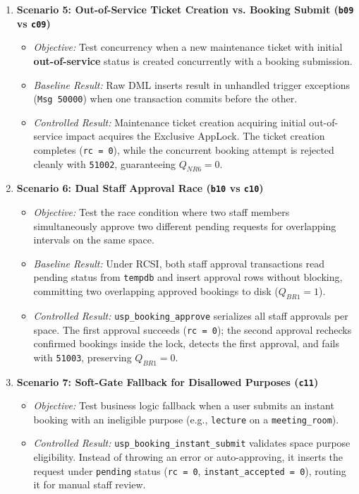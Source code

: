 \begin{enumerate}[leftmargin=*]
    \item \textbf{Scenario 5: Out-of-Service Ticket Creation vs. Booking Submit (\texttt{b09} vs \texttt{c09})}
    \begin{itemize}
        \item \emph{Objective:} Test concurrency when a new maintenance ticket with initial \textbf{out-of-service} status is created concurrently with a booking submission.
        \item \emph{Baseline Result:} Raw DML inserts result in unhandled trigger exceptions (\texttt{Msg 50000}) when one transaction commits before the other.
        \item \emph{Controlled Result:} Maintenance ticket creation acquiring initial out-of-service impact acquires the Exclusive AppLock. The ticket creation completes (\texttt{rc = 0}), while the concurrent booking attempt is rejected cleanly with \texttt{51002}, guaranteeing $Q_{NR6} = 0$.
    \end{itemize}

    \item \textbf{Scenario 6: Dual Staff Approval Race (\texttt{b10} vs \texttt{c10})}
    \begin{itemize}
        \item \emph{Objective:} Test the race condition where two staff members simultaneously approve two different pending requests for overlapping intervals on the same space.
        \item \emph{Baseline Result:} Under RCSI, both staff approval transactions read pending status from \texttt{tempdb} and insert approval rows without blocking, committing two overlapping approved bookings to disk ($Q_{BR1} = 1$).
        \item \emph{Controlled Result:} \texttt{usp\_booking\_approve} serializes all staff approvals per space. The first approval succeeds (\texttt{rc = 0}); the second approval rechecks confirmed bookings inside the lock, detects the first approval, and fails with \texttt{51003}, preserving $Q_{BR1} = 0$.
    \end{itemize}

    \item \textbf{Scenario 7: Soft-Gate Fallback for Disallowed Purposes (\texttt{c11})}
    \begin{itemize}
        \item \emph{Objective:} Test business logic fallback when a user submits an instant booking with an ineligible purpose (e.g., \texttt{lecture} on a \texttt{meeting\_room}).
        \item \emph{Controlled Result:} \texttt{usp\_booking\_instant\_submit} validates space purpose eligibility. Instead of throwing an error or auto-approving, it inserts the request under \texttt{pending} status (\texttt{rc = 0}, \texttt{instant\_accepted = 0}), routing it for manual staff review.
    \end{itemize}


\end{enumerate}
